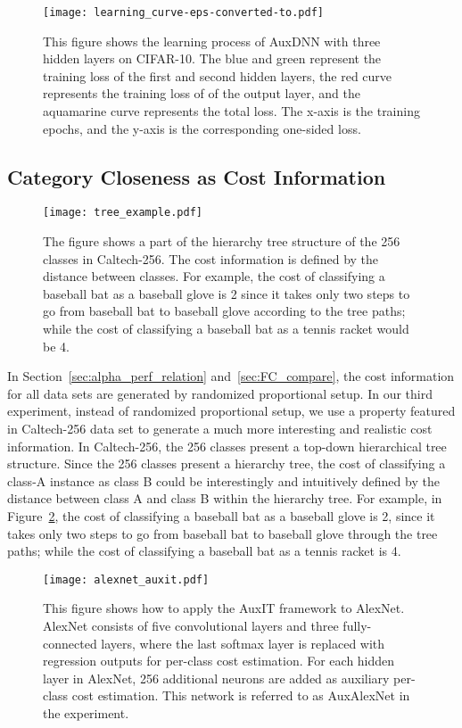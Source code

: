 \documentclass[a4paper]{article}
\begin{document}
  \begin{figure}[h]
    \centering
    \texttt{[image: learning\_curve-eps-converted-to.pdf]}
    \caption{
      This figure shows the learning process of AuxDNN with three hidden layers on CIFAR-10.
      The blue and green represent the training loss of the first and second hidden layers, the red curve represents the training loss of of the output layer, and the aquamarine curve represents the total loss.
      The x-axis is the training epochs, and the y-axis is the corresponding one-sided loss.
    }
    \label{fig:learning_plot}
  \end{figure}

\subsection{Category Closeness as Cost Information}
  \label{sec:closeness}
  \begin{figure}
    \centering
    \texttt{[image: tree\_example.pdf]}
    \caption{
      The figure shows a part of the hierarchy tree structure of the 256 classes in Caltech-256.
      The cost information is defined by the distance between classes.
      For example, the cost of classifying a baseball bat as a baseball glove is 2 since it takes only two steps to go from baseball bat to baseball glove according to the tree paths; while the cost of classifying a baseball bat as a tennis racket would be 4.
    }
    \label{fig:tree_example}
  \end{figure}

  In Section~\ref{sec:alpha_perf_relation} and~\ref{sec:FC_compare}, the cost information for all data sets are generated by randomized proportional setup.
  In our third experiment, instead of randomized proportional setup, we use a property featured in Caltech-256 data set to generate a much more interesting and realistic cost information.
  In Caltech-256, the 256 classes present a top-down hierarchical tree structure.
  Since the 256 classes present a hierarchy tree, the cost of classifying a class-A instance as class B could be interestingly and intuitively defined by the distance between class A and class B within the hierarchy tree.
  For example, in Figure~\ref{fig:tree_example}, the cost of classifying a baseball bat as a baseball glove is 2, since it takes only two steps to go from baseball bat to baseball glove through the tree paths; while the cost of classifying a baseball bat as a tennis racket is 4.

  \begin{figure}
    \centering
    \texttt{[image: alexnet\_auxit.pdf]}
    \caption{
      This figure shows how to apply the AuxIT framework to AlexNet.
      AlexNet consists of five convolutional layers and three fully-connected layers, where the last softmax layer is replaced with regression outputs for per-class cost estimation.
      For each hidden layer in AlexNet, 256 additional neurons are added as auxiliary per-class cost estimation.
      This network is referred to as AuxAlexNet in the experiment.
    }
    \label{fig:alexnet_auxit}
  \end{figure}
\end{document}
